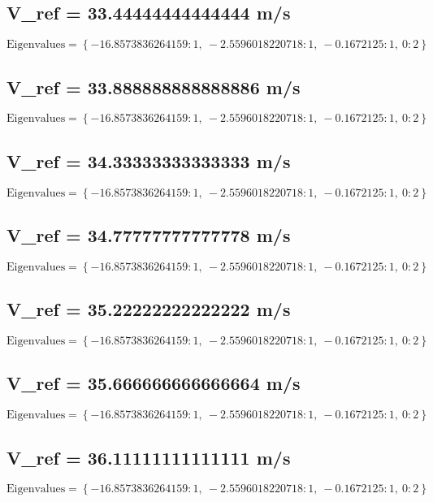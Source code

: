 \documentclass{article}
\begin{document}
\subsection*{V_ref = 33.44444444444444 m/s}
\begin{equation}
\text{Eigenvalues} = \left\{ -16.8573836264159 : 1, \  -2.5596018220718 : 1, \  -0.1672125 : 1, \  0 : 2\right\}
\end{equation}
\subsection*{V_ref = 33.888888888888886 m/s}
\begin{equation}
\text{Eigenvalues} = \left\{ -16.8573836264159 : 1, \  -2.5596018220718 : 1, \  -0.1672125 : 1, \  0 : 2\right\}
\end{equation}
\subsection*{V_ref = 34.33333333333333 m/s}
\begin{equation}
\text{Eigenvalues} = \left\{ -16.8573836264159 : 1, \  -2.5596018220718 : 1, \  -0.1672125 : 1, \  0 : 2\right\}
\end{equation}
\subsection*{V_ref = 34.77777777777778 m/s}
\begin{equation}
\text{Eigenvalues} = \left\{ -16.8573836264159 : 1, \  -2.5596018220718 : 1, \  -0.1672125 : 1, \  0 : 2\right\}
\end{equation}
\subsection*{V_ref = 35.22222222222222 m/s}
\begin{equation}
\text{Eigenvalues} = \left\{ -16.8573836264159 : 1, \  -2.5596018220718 : 1, \  -0.1672125 : 1, \  0 : 2\right\}
\end{equation}
\subsection*{V_ref = 35.666666666666664 m/s}
\begin{equation}
\text{Eigenvalues} = \left\{ -16.8573836264159 : 1, \  -2.5596018220718 : 1, \  -0.1672125 : 1, \  0 : 2\right\}
\end{equation}
\subsection*{V_ref = 36.11111111111111 m/s}
\begin{equation}
\text{Eigenvalues} = \left\{ -16.8573836264159 : 1, \  -2.5596018220718 : 1, \  -0.1672125 : 1, \  0 : 2\right\}
\end{equation}
\end{document}
